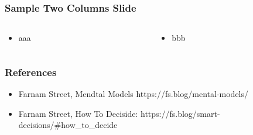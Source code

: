 \begin{frame}[fragile]\frametitle{Sample Two Columns Slide}
\begin{columns}
    \begin{column}[T]{0.6\linewidth}
      \begin{itemize}
		\item aaa
	  \end{itemize}

    \end{column}
    \begin{column}[T]{0.4\linewidth}
      \begin{itemize}
		\item bbb
	  \end{itemize}
    \end{column}
  \end{columns}
\end{frame}

\begin{frame}[fragile]\frametitle{References}
\begin{itemize}
\item Farnam Street, Mendtal Models https://fs.blog/mental-models/

\item Farnam Street, How To Deciside: https://fs.blog/smart-decisions/\#how\_to\_decide
\end{itemize}
\end{frame}